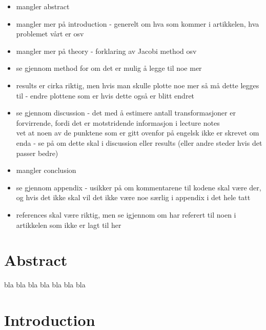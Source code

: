 \documentclass{article}
\begin{document}
\begin{itemize}
    \item mangler abstract

    \item mangler mer på introduction - generelt om hva som kommer i artikkelen, hva problemet vårt er osv

    \item mangler mer på theory - forklaring av Jacobi method osv

    \item se gjennom method for om det er mulig å legge til noe mer

    \item results er cirka riktig, men hvis man skulle plotte noe mer så må dette legges til - endre plottene som er hvis dette også er blitt endret

    \item se gjennom discussion - det med å estimere antall transformasjoner er forvirrende, fordi det er motstridende informasjon i lecture notes \\
    vet at noen av de punktene som er gitt ovenfor på engelsk ikke er skrevet om enda - se på om dette skal i discussion eller results (eller andre steder hvis det passer bedre)

    \item mangler conclusion

    \item se gjennom appendix - usikker på om kommentarene til kodene skal være der, og hvis det ikke skal vil det ikke være noe særlig i appendix i det hele tatt

    \item references skal være riktig, men se igjennom om har referert til noen i artikkelen som ikke er lagt til her
\end{itemize}


\vspace{1cm}

\section{Abstract} \label{sec:Abstract}

bla bla bla bla bla bla bla




\vspace{1cm}

\section{Introduction} \label{sec:Introduction}
\end{document}
